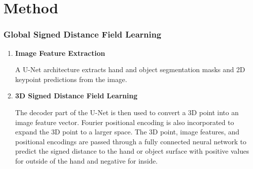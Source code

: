 \documentclass{article}
\begin{document}
\section*{Method}

\subsubsection*{Global Signed Distance Field Learning}
\begin{enumerate}
    \item \textbf{Image Feature Extraction}
    
    A U-Net architecture extracts hand and object segmentation masks and 2D keypoint predictions
    from the image.

    \item \textbf{3D Signed Distance Field Learning}
    
    The decoder part of the U-Net is then used to convert a 3D point into an image feature vector.
    Fourier positional encoding is also incorporated to expand the 3D point to a larger space. The
    3D point, image features, and positional encodings are passed through a fully connected neural
    network to predict the signed distance to the hand or object surface with positive values for
    outside of the hand and negative for inside.
\end{enumerate}
\end{document}
